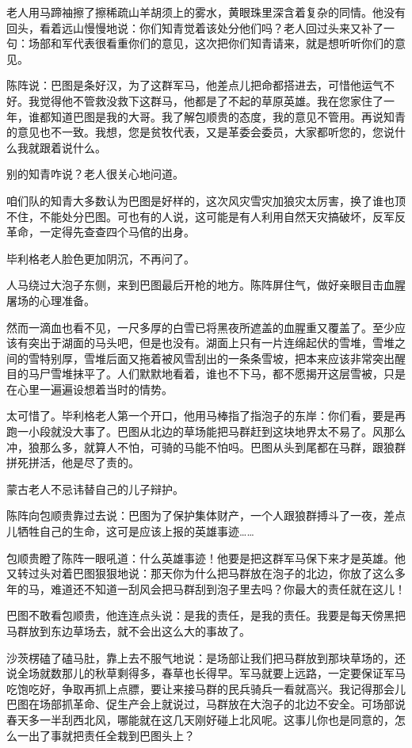 \par 老人用马蹄袖擦了擦稀疏山羊胡须上的雾水，黄眼珠里深含着复杂的同情。他没有回头，看着远山慢慢地说：你们知青觉着该处分他们吗？老人回过头来又补了一句：场部和军代表很看重你们的意见，这次把你们知青请来，就是想听听你们的意见。
\par 陈阵说：巴图是条好汉，为了这群军马，他差点儿把命都搭进去，可惜他运气不好。我觉得他不管救没救下这群马，他都是了不起的草原英雄。我在您家住了一年，谁都知道巴图是我的大哥。我了解包顺贵的态度，我的意见不管用。再说知青的意见也不一致。我想，您是贫牧代表，又是革委会委员，大家都听您的，您说什么我就跟着说什么。
\par 别的知青咋说？老人很关心地问道。
\par 咱们队的知青大多数认为巴图是好样的，这次风灾雪灾加狼灾太厉害，换了谁也顶不住，不能处分巴图。可也有的人说，这可能是有人利用自然天灾搞破坏，反军反革命，一定得先查查四个马倌的出身。
\par 毕利格老人脸色更加阴沉，不再问了。
\par 
\par 人马绕过大泡子东侧，来到巴图最后开枪的地方。陈阵屏住气，做好亲眼目击血腥屠场的心理准备。
\par 然而一滴血也看不见，一尺多厚的白雪已将黑夜所遮盖的血腥重又覆盖了。至少应该有突出于湖面的马头吧，但是也没有。湖面上只有一片连绵起伏的雪堆，雪堆之间的雪特别厚，雪堆后面又拖着被风雪刮出的一条条雪坡，把本来应该非常突出醒目的马尸雪堆抹平了。人们默默地看着，谁也不下马，都不愿揭开这层雪被，只是在心里一遍遍设想着当时的情势。
\par 太可惜了。毕利格老人第一个开口，他用马棒指了指泡子的东岸：你们看，要是再跑一小段就没大事了。巴图从北边的草场能把马群赶到这块地界太不易了。风那么冲，狼那么多，就算人不怕，可骑的马能不怕吗。巴图从头到尾都在马群，跟狼群拼死拼活，他是尽了责的。
\par 蒙古老人不忌讳替自己的儿子辩护。
\par 陈阵向包顺贵靠过去说：巴图为了保护集体财产，一个人跟狼群搏斗了一夜，差点儿牺牲自己的生命，这可是应该上报的英雄事迹……
\par 包顺贵瞪了陈阵一眼吼道：什么英雄事迹！他要是把这群军马保下来才是英雄。他又转过头对着巴图狠狠地说：那天你为什么把马群放在泡子的北边，你放了这么多年的马，难道还不知道一刮风会把马群刮到泡子里去吗？你最大的责任就在这儿！
\par 巴图不敢看包顺贵，他连连点头说：是我的责任，是我的责任。我要是每天傍黑把马群放到东边草场去，就不会出这么大的事故了。
\par 沙茨楞磕了磕马肚，靠上去不服气地说：是场部让我们把马群放到那块草场的，还说全场就数那儿的秋草剩得多，春草也长得早。军马就要上远路，一定要保证军马吃饱吃好，争取再抓上点膘，要让来接马群的民兵骑兵一看就高兴。我记得那会儿巴图在场部抓革命、促生产会上就说过，马群放在大泡子的北边不安全。可场部说春天多一半刮西北风，哪能就在这几天刚好碰上北风呢。这事儿你也是同意的，怎么一出了事就把责任全栽到巴图头上？
